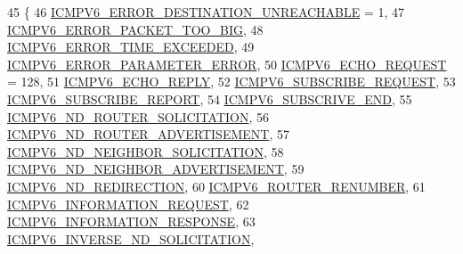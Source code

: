 \begin{DoxyCode}
45   \{
46     \hyperlink{classns3_1_1Icmpv6Header_ad13fcbee075bf00f66ffbc57dfbecb70a888f534b20f4895d2c440cd1631eeaed}{ICMPV6\_ERROR\_DESTINATION\_UNREACHABLE} = 1,
47     \hyperlink{classns3_1_1Icmpv6Header_ad13fcbee075bf00f66ffbc57dfbecb70ab681c1f821b9ac4ec7719dd3f6b72050}{ICMPV6\_ERROR\_PACKET\_TOO\_BIG},
48     \hyperlink{classns3_1_1Icmpv6Header_ad13fcbee075bf00f66ffbc57dfbecb70a25b87a102ea5fadefe07c5981cbf3446}{ICMPV6\_ERROR\_TIME\_EXCEEDED},
49     \hyperlink{classns3_1_1Icmpv6Header_ad13fcbee075bf00f66ffbc57dfbecb70a021325d1f6f21b068d6d48d06c837906}{ICMPV6\_ERROR\_PARAMETER\_ERROR},
50     \hyperlink{classns3_1_1Icmpv6Header_ad13fcbee075bf00f66ffbc57dfbecb70aee9d19b2f71a1cb9b076d170cfcd4231}{ICMPV6\_ECHO\_REQUEST} = 128,
51     \hyperlink{classns3_1_1Icmpv6Header_ad13fcbee075bf00f66ffbc57dfbecb70aa20a65a542b5851b5e711d036f1d0533}{ICMPV6\_ECHO\_REPLY},
52     \hyperlink{classns3_1_1Icmpv6Header_ad13fcbee075bf00f66ffbc57dfbecb70a9734e05e8472705dde98efe44a196db0}{ICMPV6\_SUBSCRIBE\_REQUEST},
53     \hyperlink{classns3_1_1Icmpv6Header_ad13fcbee075bf00f66ffbc57dfbecb70a809c5475f82db5440e6e7b3243eb2f8c}{ICMPV6\_SUBSCRIBE\_REPORT},
54     \hyperlink{classns3_1_1Icmpv6Header_ad13fcbee075bf00f66ffbc57dfbecb70acf00e2712f867f75d51fa7d26ca1d25a}{ICMPV6\_SUBSCRIVE\_END},
55     \hyperlink{classns3_1_1Icmpv6Header_ad13fcbee075bf00f66ffbc57dfbecb70a8620b40d78b2bf3cc1fe4b3a555de671}{ICMPV6\_ND\_ROUTER\_SOLICITATION},
56     \hyperlink{classns3_1_1Icmpv6Header_ad13fcbee075bf00f66ffbc57dfbecb70a3b4761cf875ed921c977c877f804dbf4}{ICMPV6\_ND\_ROUTER\_ADVERTISEMENT},
57     \hyperlink{classns3_1_1Icmpv6Header_ad13fcbee075bf00f66ffbc57dfbecb70ad34550bf091d453d25f2f9e2df2594e0}{ICMPV6\_ND\_NEIGHBOR\_SOLICITATION},
58     \hyperlink{classns3_1_1Icmpv6Header_ad13fcbee075bf00f66ffbc57dfbecb70a702ff072042857f6e5d2b118aad703b2}{ICMPV6\_ND\_NEIGHBOR\_ADVERTISEMENT},
59     \hyperlink{classns3_1_1Icmpv6Header_ad13fcbee075bf00f66ffbc57dfbecb70aeb20b493d906ead8f08096e0d9c120e8}{ICMPV6\_ND\_REDIRECTION},
60     \hyperlink{classns3_1_1Icmpv6Header_ad13fcbee075bf00f66ffbc57dfbecb70a879528cf29bac112069aee9615f156fc}{ICMPV6\_ROUTER\_RENUMBER},
61     \hyperlink{classns3_1_1Icmpv6Header_ad13fcbee075bf00f66ffbc57dfbecb70a627de94977970f9a24db3763ca5c3ca8}{ICMPV6\_INFORMATION\_REQUEST},
62     \hyperlink{classns3_1_1Icmpv6Header_ad13fcbee075bf00f66ffbc57dfbecb70aadc530987bfaf1282094a245f3e60fac}{ICMPV6\_INFORMATION\_RESPONSE},
63     \hyperlink{classns3_1_1Icmpv6Header_ad13fcbee075bf00f66ffbc57dfbecb70ab9cd48f8e4b52600c74ee8e27be61b55}{ICMPV6\_INVERSE\_ND\_SOLICITATION},

\end{DoxyCode}
